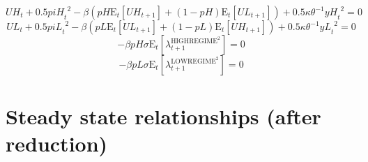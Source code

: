 \begin{equation}
{U\!H}_{t} + 0.5{{p\!i\!H}_{t}}^{2} - {\beta} \left({{p\!H}} {\mathrm{E}_{t}\left[{U\!H}_{t+1}\right]} + \left(1 - {p\!H}\right) {\mathrm{E}_{t}\left[{U\!L}_{t+1}\right]}\right) + 0.5{\kappa} {\theta}^{-1} {{y\!H}_{t}}^{2} = 0
\end{equation}
\begin{equation}
{U\!L}_{t} + 0.5{{p\!i\!L}_{t}}^{2} - {\beta} \left({{p\!L}} {\mathrm{E}_{t}\left[{U\!L}_{t+1}\right]} + \left(1 - {p\!L}\right) {\mathrm{E}_{t}\left[{U\!H}_{t+1}\right]}\right) + 0.5{\kappa} {\theta}^{-1} {{y\!L}_{t}}^{2} = 0
\end{equation}
\begin{equation}
-{\beta} {{p\!H}} {\sigma} {\mathrm{E}_{t}\left[\lambda^{\mathrm{HIGHREGIME}^{\mathrm{2}}}_{t+1}\right]} = 0
\end{equation}
\begin{equation}
-{\beta} {{p\!L}} {\sigma} {\mathrm{E}_{t}\left[\lambda^{\mathrm{LOWREGIME}^{\mathrm{2}}}_{t+1}\right]} = 0
\end{equation}



\section{Steady state relationships (after reduction)}

